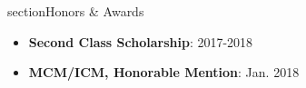\documentclass[letterpaper,11pt]{article}
\newcommand{\resumeSubHeadingListStart}{\begin{itemize}[leftmargin=*]}
\newcommand{\resumeSubHeadingListEnd}{\end{itemize}}
\begin{document}
section{Honors \& Awards}
\resumeSubHeadingListStart
   \item{
      \textbf{Second Class Scholarship}{: 2017-2018}
   }
   \item{
      \textbf{MCM/ICM, Honorable Mention}{: Jan. 2018}
   }
\resumeSubHeadingListEnd
   


\end{document}
